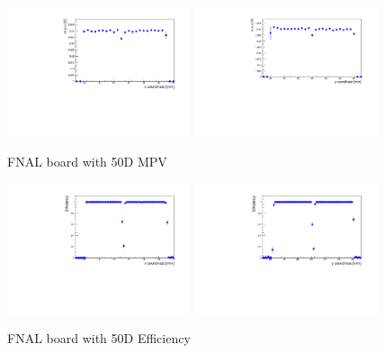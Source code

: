 \documentclass[preprint,1p]{elsarticle}
\begin{document}
\begin{figure}[htbp] 
\centering
\includegraphics[width=0.48\textwidth]{figs/FNALBoard_HPK50DPix_Run847-891/MPV_vs_X_Ch4_5.pdf} 
\includegraphics[width=0.48\textwidth]{figs/FNALBoard_HPK50DPix_Run847-891/MPV_vs_Y_Ch3_4.pdf} 
\caption{FNAL board with 50D MPV} 
\label{fig:Sensors} 
\end{figure} 

\begin{figure}[htbp] 
\centering
\includegraphics[width=0.48\textwidth]{figs/FNALBoard_HPK50DPix_Run847-891/Eff_vs_X_Ch4_5.pdf} 
\includegraphics[width=0.48\textwidth]{figs/FNALBoard_HPK50DPix_Run847-891/Eff_vs_Y_Ch3_4.pdf} 
\caption{FNAL board with 50D Efficiency} 
\label{fig:Sensors} 
\end{figure} 
\end{document}
